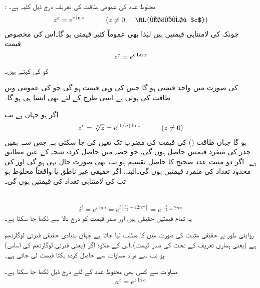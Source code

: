 : مخلوط عدد  کی عمومی طاقت کی تعریف درج ذیل کلیہ ہے۔
\begin{align}\label{مساوات_مخلوط_لوگارتھم_ث}
z^c=e^{c\ln z}\quad \quad \quad (z\ne 0, \quad \text{\RL{مخلوط $c$}})
\end{align}
چونکہ  کی لامتناہی قیمتیں ہیں لہٰذا  بھی عموماً کثیر قیمتی ہو گا۔اس کی مخصوص قیمت
\begin{align*}
z^c=e^{c\operatorname{Ln} z}
\end{align*}
کو  کی  کہتے ہیں۔

 کی صورت میں  واحد قیمتی ہو گا جس کی وہی قیمت ہو گی جو   کی عمومی  ویں طاقت کی ہوتی ہے۔اسی طرح  کے لئے بھی ایسا ہی ہو گا۔

اگر  ہو جہاں  ہے تب
\begin{align*}
z^c=\sqrt[\leftroot{-2}\uproot{2}n]{z}=e^{(1/n)\ln z}\quad \quad \quad (z\ne 0)
\end{align*}
ہو گا جہاں طاقت () کی قیمت  کی مضرب تک تعین کی جا سکتی ہے جس سے ہمیں جذر کی  منفرد قیمتیں حاصل ہوں گی، جو حصہ  میں حاصل کردہ نتیجہ کے عین مطابق ہے۔ اگر  دو مثبت عدد صحیح کا حاصل تقسیم ہو تب بھی صورت حال یہی ہو گی اور  کی محدود تعداد کی منفرد قیمتیں ہوں گی۔البتہ، اگر  حقیقی غیر ناطق یا واقعتاً مخلوط ہو تب  کی لامتناہی تعداد کی قیمتیں ہوں گی۔ 

\quad {}\\
\begin{align*}
i^i=e^{i\ln i}=e^{i[i\tfrac{\pi}{2}\mp i2n\pi]}=e^{-\tfrac{\pi}{2}\pm 2n\pi}
\end{align*}
یہ تمام قیمتیں حقیقی ہیں اور صدر قیمت  کو درج بالا سے  لکھا جا سکتا ہے۔

روایتی طور پر حقیقی مثبت  کی صورت میں  کا مطلب  لیا جاتا ہے جہاں  بنیادی حقیقی قدرتی لوگارتھم ہے (یعنی ہماری تعریف کے تحت  کی صدر قیمت)۔اس کے علاوہ اگر  (یعنی قدرتی لوگارتھم کی اساس) ہو تب  سے مراد مساوات  سے حاصل کردہ یکتا قیمت لی جاتی ہے۔

مساوات  سے کسی بھی مخلوط عدد  کے لئے درج ذیل لکھا جا سکتا ہے۔
\begin{align}\label{مساوات_مخلوط_لوگارتھم_ج}
a^z=e^{z\ln a}
\end{align}

